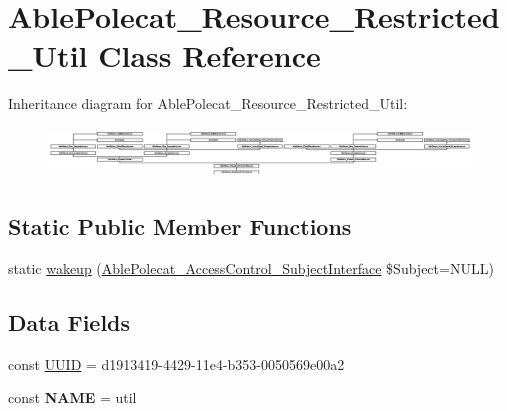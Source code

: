 \hypertarget{class_able_polecat___resource___restricted___util}{}\section{Able\+Polecat\+\_\+\+Resource\+\_\+\+Restricted\+\_\+\+Util Class Reference}
\label{class_able_polecat___resource___restricted___util}
Inheritance diagram for Able\+Polecat\+\_\+\+Resource\+\_\+\+Restricted\+\_\+\+Util\+:\begin{figure}[H]
\begin{center}
\leavevmode
\includegraphics[height=1.327913cm]{class_able_polecat___resource___restricted___util}
\end{center}
\end{figure}
\subsection*{Static Public Member Functions}
\begin{DoxyCompactItemize}
\item 
static \hyperlink{class_able_polecat___resource___restricted___util_a3f2135f6ad45f51d075657f6d20db2cd}{wakeup} (\hyperlink{interface_able_polecat___access_control___subject_interface}{Able\+Polecat\+\_\+\+Access\+Control\+\_\+\+Subject\+Interface} \$Subject=N\+U\+L\+L)
\end{DoxyCompactItemize}
\subsection*{Data Fields}
\begin{DoxyCompactItemize}
\item 
const \hyperlink{class_able_polecat___resource___restricted___util_a74b892c8c0b86bf9d04c5819898c51e7}{U\+U\+I\+D} = \textquotesingle{}d1913419-\/4429-\/11e4-\/b353-\/0050569e00a2\textquotesingle{}
\item 
\hypertarget{class_able_polecat___resource___restricted___util_a244352f035b82b20b0efa506167fd862}{}const {\bfseries N\+A\+M\+E} = \textquotesingle{}util\textquotesingle{}\label{class_able_polecat___resource___restricted___util_a244352f035b82b20b0efa506167fd862}

\end{DoxyCompactItemize}
